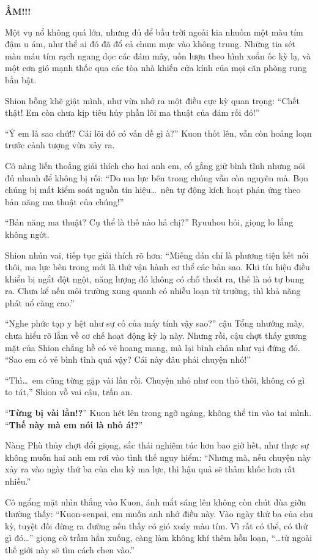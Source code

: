\documentclass[../main.tex]{subfiles}
\begin{document}
  {\large{\textbf{ẦM!!!}}}

Một vụ nổ không quá lớn, nhưng đủ để bầu trời ngoài kia nhuốm một màu tím đậm u ám, như thể ai đó đã đổ cả chum mực vào không trung. Những tia sét màu máu tím rạch ngang dọc các đám mây, uốn lượn theo hình xoắn ốc kỳ lạ, và một cơn gió mạnh thốc qua các tòa nhà khiến cửa kính của mọi căn phòng rung bần bật.

Shion bỗng khẽ giật mình, như vừa nhớ ra một điều cực kỳ quan trọng: ``Chết thật! Em còn chưa kịp tiêu hủy phần lõi ma thuật của đám rối đó!''

``Ý em là sao chứ!? Cái lõi đó có vấn đề gì à?'' Kuon thốt lên, vẫn còn hoảng loạn trước cảnh tượng vừa xảy ra.

Cô nàng liến thoắng giải thích cho hai anh em, cố gắng giữ bình tĩnh nhưng nói đủ nhanh để không bị rối: ``Do ma lực bên trong chúng vẫn còn nguyên mà. Bọn chúng bị mất kiểm soát nguồn tín hiệu\dots\ nên tự động kích hoạt phản ứng theo bản năng ma thuật của chúng!''

``Bản năng ma thuật? Cụ thể là thế nào hả chị?'' Ryuuhou hỏi, giọng lo lắng không ngớt.

Shion nhún vai, tiếp tục giải thích rõ hơn: ``Miếng dán chỉ là phương tiện kết nối thôi, ma lực bên trong mới là thứ vận hành cơ thể các bản sao. Khi tín hiệu điều khiển bị ngắt đột ngột, năng lượng đó không có chỗ thoát ra, thế là nó tự bung ra. Chưa kể nếu môi trường xung quanh có nhiễu loạn từ trường, thì khả năng phát nổ càng cao.''

``Nghe phức tạp y hệt như sự cố của máy tính vậy sao?'' cậu Tổng nhướng mày, chưa hiểu rõ lắm về cơ chế hoạt động kỳ lạ này. Nhưng rồi, cậu chợt thấy gương mặt của Shion chẳng hề có vẻ hoang mang, mà lại bình chân như vại đứng đó. ``Sao em có vẻ bình tĩnh quá vậy? Cái này đâu phải chuyện nhỏ!''

``Thì\dots\ em cũng từng gặp vài lần rồi. Chuyện nhỏ như con thỏ thôi, không có gì to tát,'' Shion vỗ vai cậu, trấn an.

``\textbf{Từng bị vài lần!?}'' Kuon hét lên trong ngỡ ngàng, không thể tin vào tai mình. ``\textbf{Thế này mà em nói là nhỏ á!?}''

Nàng Phù thủy chợt đổi giọng, sắc thái nghiêm túc hơn bao giờ hết, như thực sự không muốn hai anh em rơi vào tình thế nguy hiểm: ``Nhưng mà, nếu chuyện này xảy ra vào ngày thứ ba của chu kỳ ma lực, thì hậu quả sẽ thảm khốc hơn rất nhiều.''

Cô ngẩng mặt nhìn thẳng vào Kuon, ánh mắt sáng lên không còn chút đùa giỡn thường thấy: ``Kuon-senpai, em muốn anh nhớ điều này. Vào ngày thứ ba của chu kỳ, tuyệt đối đừng ra đường nếu thấy có gió xoáy màu tím. Vì rất có thể, có thứ gì đó\dots'' giọng cô trầm hẳn xuống, càng làm không khí thêm hỗn loạn, ``\dots từ ngoài thế giới này sẽ tìm cách chen vào.''
\end{document}
